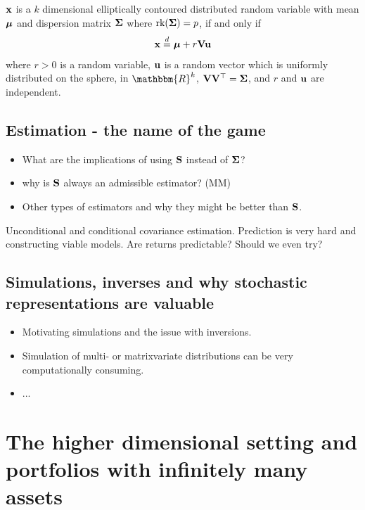 \documentclass[]{book}\usepackage{knitr}
\begin{document}
\begin{lemma}\label{lem:stoc_rep}
	$\mathbf{x}$ is a $k$ dimensional elliptically contoured distributed random variable with mean $\mbox{\boldmath$\mu$}$ and dispersion matrix $\mathbf{\Sigma}$ where $\text{rk} (\mathbf{\Sigma}) = p$, if and only if 
	$$
	\mathbf{x} \stackrel{d}{=} \mbox{\boldmath$\mu$} + r \mathbf{V} \mathbf{u}
	$$
	where $r >0$ is a random variable, $\mathbf{u}$ is a random vector which is uniformly distributed on the sphere, in $\mathbbm{R}^k$, $\mathbf{V}\mathbf{V}^\top=\mathbf{\Sigma}$, and $r$ and $\mathbf{u}$ are independent.
\end{lemma}

\section{Estimation - the name of the game}

\begin{itemize}
	\item What are the implications of using $\mathbf{S}$ instead of $\mathbf{\Sigma}$?
	\item why is $\mathbf{S}$  always an admissible estimator? (MM)
	\item Other types of estimators and why they might be better than $\mathbf{S}$.
\end{itemize}

\begin{remark}
	Unconditional and conditional covariance estimation. Prediction is very hard and constructing viable models. Are returns predictable? Should we even try?
\end{remark}

\section{Simulations, inverses and why stochastic representations are valuable}
\begin{itemize}
	\item Motivating simulations and the issue with inversions.
	\item Simulation of multi- or matrixvariate distributions can be very computationally consuming.
	\item ...
\end{itemize}
\chapter{The higher dimensional setting and portfolios with infinitely many assets}\label{ch:highdim}
\end{document}
